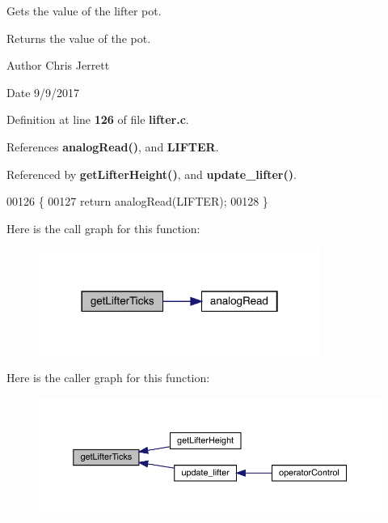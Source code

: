 Gets the value of the lifter pot. 

\begin{DoxyReturn}{Returns}
the value of the pot. 
\end{DoxyReturn}
\begin{DoxyAuthor}{Author}
Chris Jerrett 
\end{DoxyAuthor}
\begin{DoxyDate}{Date}
9/9/2017 
\end{DoxyDate}


Definition at line \textbf{ 126} of file \textbf{ lifter.\+c}.



References \textbf{ analog\+Read()}, and \textbf{ L\+I\+F\+T\+ER}.



Referenced by \textbf{ get\+Lifter\+Height()}, and \textbf{ update\+\_\+lifter()}.


\begin{DoxyCode}
00126                      \{
00127   \textcolor{keywordflow}{return} analogRead(LIFTER);
00128 \}
\end{DoxyCode}
Here is the call graph for this function\+:\nopagebreak
\begin{figure}[H]
\begin{center}
\leavevmode
\includegraphics[width=261pt]{lifter_8c_acdf909159b0406c48099843f2306be78_cgraph}
\end{center}
\end{figure}
Here is the caller graph for this function\+:\nopagebreak
\begin{figure}[H]
\begin{center}
\leavevmode
\includegraphics[width=350pt]{lifter_8c_acdf909159b0406c48099843f2306be78_icgraph}
\end{center}
\end{figure}
\mbox{\label{lifter_8c_ab0460888f3213e5510bd25ae1e152a75}} 
